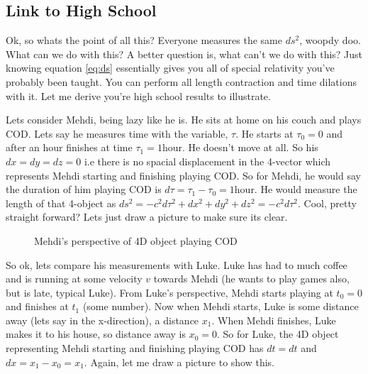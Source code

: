 \subsection{Link to High School}

Ok, so whats the point of all this? Everyone measures the same $ds^2$, woopdy doo. What can we do with this? A better question is, what can't we do with this? Just knowing equation \eqref{eq:ds} essentially gives you all of special relativity you've probably been taught. You can perform all length contraction and time dilations with it. Let me derive you're high school results to illustrate. 

Lets consider Mehdi, being lazy like he is. He sits at home on his couch and plays COD. Lets say he measures time with the variable, $\tau$. He starts at $\tau_0 = 0$ and after an hour finishes at time $\tau_1 = 1$hour. He doesn't move at all. So his $dx = dy = dz =0$ i.e there is no spacial displacement in the 4-vector which represents Mehdi starting and finishing playing COD. So for Mehdi, he would say the duration of him playing COD is $d\tau = \tau_1 - \tau_0 = 1$hour. He would measure the length of that 4-object as $ds^2 = - c^2 d\tau^2 + dx^2 + dy^2 + dz^2 = -c^2 d\tau^2$. Cool, pretty straight forward? Lets just draw a picture to make sure its clear. 

\begin{figure}[h]
  \centering
{}
\caption{Mehdi's perspective of 4D object playing COD}
\label{fig:M4d}
\end{figure}

So ok, lets compare his measurements with Luke. Luke has had to much coffee and is running at some velocity $v$ towards Mehdi (he wants to play games also, but is late, typical Luke). From Luke's perspective, Mehdi starts playing at $t_0 = 0$ and finishes at $t_1$ (some number). Now when Mehdi starts, Luke is some distance away (lets say in the x-direction), a distance $x_1$. When Mehdi finishes, Luke makes it to his house, so distance away is $x_0 =0$. So for Luke, the 4D object representing Mehdi starting and finishing playing COD has $dt = dt$ and $dx = x_1 - x_0 = x_1$. Again, let me draw a picture to show this. 


